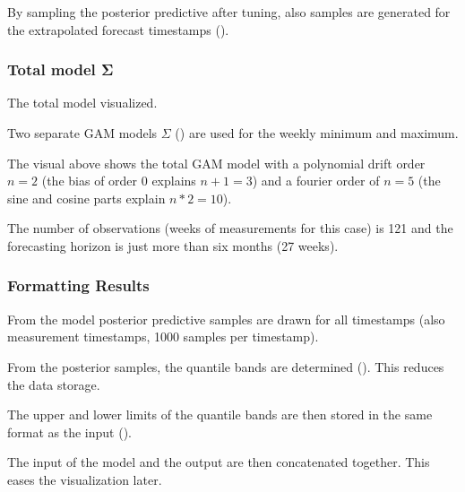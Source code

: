 \documentclass[letterpaper,10pt,english]{sphinxmanual}
\let\sphinxpxdimen\pdfpxdimen\else\newdimen\sphinxpxdimen
\begin{document}
By sampling the posterior predictive after tuning, also samples are generated for the extrapolated forecast timestamps ({\hyperref[\detokenize{autoapi/src/forecast/forecast/index:src.forecast.forecast.determine_estimates}]{}}).


\subsubsection{Total model Σ}
\label{\detokenize{modeling:total-model}}\begin{quote}

\noindent{\hspace*{\fill}\sphinxincludegraphics[width=600\sphinxpxdimen]{{graph_model}.png}\hspace*{\fill}}
\end{quote}

The total model visualized.

Two separate GAM models \(\Sigma\) ({\hyperref[\detokenize{autoapi/src/model/model/index:src.model.model.create_model}]{}}) are used for the weekly minimum and maximum.

The visual above shows the total GAM model with a polynomial drift order \(n=2\) (the bias of order 0 explains \(n+1=3\)) and a fourier order of \(n=5\) (the sine and cosine parts explain \(n*2=10\)).

The number of observations (weeks of measurements for this case) is 121 and the forecasting horizon is just more than six months (27 weeks).


\subsubsection{Formatting Results}
\label{\detokenize{modeling:formatting-results}}
From the model posterior predictive samples are drawn for all timestamps (also measurement timestamps, 1000 samples per timestamp).

From the posterior samples, the quantile bands are determined ().
This reduces the data storage.

The upper and lower limits of the quantile bands are then stored in the same format as the input ().

The input of the model and the output are then concatenated together.
This eases the visualization later.
\begin{quote}

\noindent{\hspace*{\fill}\sphinxincludegraphics[width=800\sphinxpxdimen]{{data_stored}.png}\hspace*{\fill}}
\end{quote}
\end{document}
